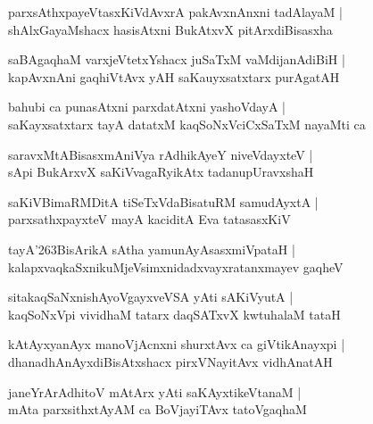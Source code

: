 \documentclass[twoside,12pt,openright]{book}
\def\S{\char'263}
\newcounter{shloka}[chapter]
\begin{document}
\begin{shloka}%
parxsAthxpayeVtasxKiVdAvxrA pakAvxnAnxni tadAlayaM |\\
shAlxGayaMshacx hasisAtxni BukAtxvX pitArxdiBisasxha 
\end{shloka}

\begin{shloka}%
saBAgaqhaM varxjeVtetxYshacx juSaTxM vaMdijanAdiBiH |\\
kapAvxnAni gaqhiVtAvx yAH saKauyxsatxtarx purAgatAH 
\end{shloka}

\begin{shloka}%
bahubi ca punasAtxni parxdatAtxni yashoVdayA |\\
saKayxsatxtarx tayA datatxM kaqSoNxVciCxSaTxM nayaMti ca 
\end{shloka}

\begin{shloka}%
saravxMtABisasxmAniVya rAdhikAyeY niveVdayxteV |\\
sApi BukArxvX saKiVvagaRyikAtx tadanupUravxshaH 
\end{shloka}

\begin{shloka}%
saKiVBimaRMDitA tiSeTxVdaBisatuRM samudAyxtA |\\
parxsathxpayxteV mayA kaciditA Eva tatasasxKiV 
\end{shloka}

\begin{shloka}%
tayA\S BisArikA sAtha yamunAyAsasxmiVpataH |\\
kalapxvaqkaSxnikuMjeVsimxnidadxvayxratanxmayev gaqheV 
\end{shloka}

\begin{shloka}%
sitakaqSaNxnishAyoVgayxveVSA yAti sAKiVyutA |\\
kaqSoNxVpi vividhaM tatarx daqSATxvX kwtuhalaM tataH 
\end{shloka}

\begin{shloka}%
kAtAyxyanAyx manoVjAcnxni shurxtAvx ca giVtikAnayxpi |\\
dhanadhAnAyxdiBisAtxshacx pirxVNayitAvx vidhAnatAH 
\end{shloka}

\begin{shloka}%
janeYrArAdhitoV mAtArx yAti saKAyxtikeVtanaM |\\
mAta parxsithxtAyAM ca BoVjayiTAvx tatoVgaqhaM 
\end{shloka}
\end{document}
